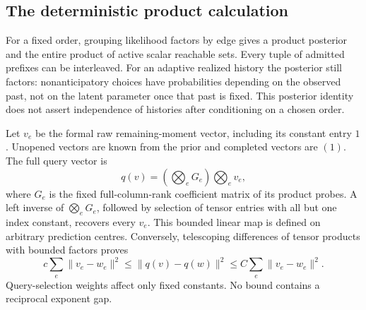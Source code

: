 \subsection{The deterministic product calculation}
For a fixed order, grouping likelihood factors by edge gives a product
posterior and the entire product of active scalar reachable sets. Every
tuple of admitted prefixes can be interleaved. For an adaptive realized
history the posterior still factors: nonanticipatory choices have
probabilities depending on the observed past, not on the latent
parameter once that past is fixed. This posterior identity does not
assert independence of histories after conditioning on a chosen order.

Let $v_e$ be the formal raw remaining-moment vector, including its
constant entry $1$. Unopened vectors are known from the prior and
completed vectors are $(1)$. The full query vector is
\[
 q(v)=\left(\bigotimes_eG_e\right)\bigotimes_ev_e,
\]
where $G_e$ is the fixed full-column-rank coefficient matrix of its
product probes. A left inverse of $\bigotimes_eG_e$, followed by
selection of tensor entries with all but one index constant, recovers
every $v_e$. This bounded linear map is defined on arbitrary prediction
centres. Conversely, telescoping differences of tensor products with
bounded factors proves
\begin{equation}\label{eq:v25-tensor-metric}
 c\sum_e\|v_e-w_e\|^2\le\|q(v)-q(w)\|^2
                         \le C\sum_e\|v_e-w_e\|^2.
\end{equation}
Query-selection weights affect only fixed constants. No bound contains
a reciprocal exponent gap.

